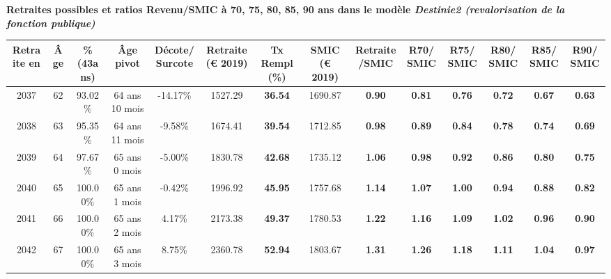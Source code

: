  \vspace{0.1cm} 
{\bf \noindent Retraites possibles et ratios Revenu/SMIC à 70, 75, 80, 85, 90 ans dans le modèle \emph{Destinie2 (revalorisation de la fonction publique)}}  
 
\begin{adjustbox}{max width=\textwidth} 
\begin{tabular}[htb]{|c|c||c|c|c||c|c||c|c||c|c|c|c|c|} 
\hline 
 Retraite en &  Âge &  \%(43ans) &  Âge pivot &  Décote/Surcote &  Retraite (\euro{} 2019) &  Tx Rempl(\%) &  SMIC (\euro{} 2019) &  Retraite/SMIC &  R70/SMIC &  R75/SMIC &  R80/SMIC &  R85/SMIC &  R90/SMIC \\ 
\hline \hline 
 2037 &  62 &  93.02\% &  64 ans 10 mois &  -14.17\% &  1527.29 &  {\bf 36.54} &  1690.87 &  {\bf {\color{red} 0.90}} &  {\bf {\color{red} 0.81}} &  {\bf {\color{red} 0.76}} &  {\bf {\color{red} 0.72}} &  {\bf {\color{red} 0.67}} &  {\bf {\color{red} 0.63}} \\ 
\hline 
 2038 &  63 &  95.35\% &  64 ans 11 mois &  -9.58\% &  1674.41 &  {\bf 39.54} &  1712.85 &  {\bf {\color{red} 0.98}} &  {\bf {\color{red} 0.89}} &  {\bf {\color{red} 0.84}} &  {\bf {\color{red} 0.78}} &  {\bf {\color{red} 0.74}} &  {\bf {\color{red} 0.69}} \\ 
\hline 
 2039 &  64 &  97.67\% &  65 ans 0 mois &  -5.00\% &  1830.78 &  {\bf 42.68} &  1735.12 &  {\bf 1.06} &  {\bf {\color{red} 0.98}} &  {\bf {\color{red} 0.92}} &  {\bf {\color{red} 0.86}} &  {\bf {\color{red} 0.80}} &  {\bf {\color{red} 0.75}} \\ 
\hline 
 2040 &  65 &  100.00\% &  65 ans 1 mois &  -0.42\% &  1996.92 &  {\bf 45.95} &  1757.68 &  {\bf 1.14} &  {\bf 1.07} &  {\bf {\color{red} 1.00}} &  {\bf {\color{red} 0.94}} &  {\bf {\color{red} 0.88}} &  {\bf {\color{red} 0.82}} \\ 
\hline 
 2041 &  66 &  100.00\% &  65 ans 2 mois &  4.17\% &  2173.38 &  {\bf 49.37} &  1780.53 &  {\bf 1.22} &  {\bf 1.16} &  {\bf 1.09} &  {\bf 1.02} &  {\bf {\color{red} 0.96}} &  {\bf {\color{red} 0.90}} \\ 
\hline 
 2042 &  67 &  100.00\% &  65 ans 3 mois &  8.75\% &  2360.78 &  {\bf 52.94} &  1803.67 &  {\bf 1.31} &  {\bf 1.26} &  {\bf 1.18} &  {\bf 1.11} &  {\bf 1.04} &  {\bf {\color{red} 0.97}} \\ 
\hline 
\hline 
\end{tabular} 
\end{adjustbox} 
 
 \vspace{0.1cm} 

